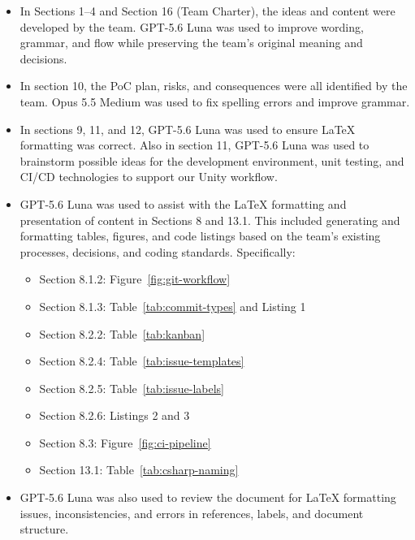 \documentclass{article}
\begin{document}

\begin{itemize}
    \item In Sections 1--4 and Section 16 (Team Charter), the ideas and content
    were developed by the team. GPT-5.6 Luna was used to improve wording,
    grammar, and flow while preserving the team's original meaning and decisions.

    \item In section 10, the PoC plan, risks, and consequences were all identified by the team.
    Opus 5.5 Medium was used to fix spelling errors and improve grammar.

    \item In sections 9, 11, and 12, GPT-5.6 Luna was used to ensure \LaTeX{} formatting was correct. Also in section 11,
    GPT-5.6 Luna was used to brainstorm possible ideas for the development environment, unit testing, and CI/CD technologies to support
    our Unity workflow.
  
    \item GPT-5.6 Luna was used to assist with the LaTeX formatting and
    presentation of content in Sections 8 and 13.1. This included generating
    and formatting tables, figures, and code listings based on the team's
    existing processes, decisions, and coding standards. Specifically:

    \begin{itemize}
        \item Section 8.1.2: Figure~\ref{fig:git-workflow}
        \item Section 8.1.3: Table~\ref{tab:commit-types} and Listing 1
        \item Section 8.2.2: Table~\ref{tab:kanban}
        \item Section 8.2.4: Table~\ref{tab:issue-templates}
        \item Section 8.2.5: Table~\ref{tab:issue-labels}
        \item Section 8.2.6: Listings 2 and 3
        \item Section 8.3: Figure~\ref{fig:ci-pipeline}
        \item Section 13.1: Table~\ref{tab:csharp-naming}
    \end{itemize}

    \item GPT-5.6 Luna was also used to review the document for
    LaTeX formatting issues, inconsistencies, and errors in references,
    labels, and document structure.
\end{itemize}
\end{document}
